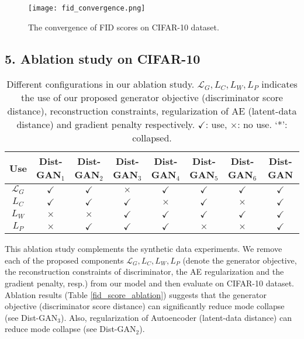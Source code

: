 \documentclass[runningheads]{llncs}
\begin{document}
\begin{figure}
\centering
\scriptsize
\texttt{[image: fid\_convergence.png]}
\vspace*{-4mm}\caption{The convergence of FID scores on CIFAR-10 dataset.}
\label{fid_curve}
\end{figure}


\subsection*{5. Ablation study on CIFAR-10}

\begin{table}
\centering
\scriptsize
\caption{Different configurations in our ablation study. $\mathcal{L}_G, L_C, L_W, L_P$ indicates the use of our proposed generator objective (discriminator score distance), reconstruction constraints, regularization of AE (latent-data distance) and gradient penalty respectively. $\checkmark$: use, $\times$: no use. `*': collapsed.}
\begin{tabular}{c | c | c | c | c | c | c | c }
\hline
 Use & \textbf{Dist-GAN$_1$} & \textbf{Dist-GAN$_2$} & \textbf{Dist-GAN$_3$} & \textbf{Dist-GAN$_4$} & \textbf{Dist-GAN$_5$} & \textbf{Dist-GAN$_6$} & \textbf{Dist-GAN} \\
\hline
$\mathcal{L}_G$ & $\checkmark$ & $\checkmark$ & $\times$ & $\checkmark$ & $\checkmark$ & $\checkmark$ & $\checkmark$ \\
$L_C$ & $\checkmark$ & $\checkmark$ & $\checkmark$ & $\times$ & $\checkmark$ & $\times$ & $\checkmark$ \\
$L_W$ & $\times$ & $\times$ & $\checkmark$ & $\checkmark$ & $\checkmark$ & $\checkmark$ & $\checkmark$ \\
$L_P$ & $\times$ & $\checkmark$ & $\checkmark$ & $\checkmark$ & $\times$ & $\times$ & $\checkmark$
\end{tabular}
\label{setting_ablation}
\end{table}

This ablation study complements the synthetic data experiments. We remove each of the proposed components $\mathcal{L}_G, L_C, L_W, L_P$ (denote the generator objective, the reconstruction constraints of discriminator, the AE regularization and the gradient penalty, resp.) from our model and then evaluate on CIFAR-10 dataset. Ablation results (Table \ref{fid_score_ablation}) suggests that the generator objective (discriminator score distance) can significantly reduce mode collapse (see Dist-GAN$_3$). Also,  regularization of Autoencoder (latent-data distance) can reduce mode collapse (see Dist-GAN$_2$).
\end{document}
